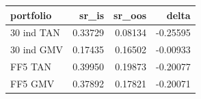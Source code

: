 \begin{tabular}{lrrr}
\toprule
portfolio & sr\_is & sr\_oos & delta \\
\midrule
30 ind TAN & 0.33729 & 0.08134 & -0.25595 \\
30 ind GMV & 0.17435 & 0.16502 & -0.00933 \\
FF5 TAN & 0.39950 & 0.19873 & -0.20077 \\
FF5 GMV & 0.37892 & 0.17821 & -0.20071 \\
\bottomrule
\end{tabular}
